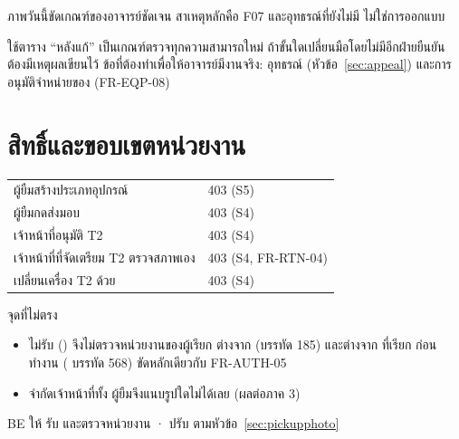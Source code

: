 \vpart[ต้องตัดสิน] ภาพวันนี้ขัดเกณฑ์ของอาจารย์ชัดเจน สาเหตุหลักคือ F07 และอุทธรณ์ที่ยังไม่มี ไม่ใช่การออกแบบ

ใช้ตาราง ``หลังแก้'' เป็นเกณฑ์ตรวจทุกความสามารถใหม่ ถ้าขั้นใดเปลี่ยนมือโดยไม่มีอีกฝ่ายยืนยัน ต้องมีเหตุผลเขียนไว้
ข้อที่ต้องทำเพื่อให้อาจารย์มีงานจริง: อุทธรณ์ (หัวข้อ~\ref{sec:appeal}) และการอนุมัติจำหน่ายของ (FR-EQP-08)

\section{สิทธิ์และขอบเขตหน่วยงาน}
\label{sec:scope}

\begin{goodbox}[title={ตรวจแล้ว --- สิทธิ์ตามบทบาทที่ทดสอบ ถูกทุกข้อ}]
\begin{tabular}{L{6.4cm}L{7.4cm}}
ผู้ยืมสร้างประเภทอุปกรณ์ & 403  (S5) \\
ผู้ยืมกดส่งมอบ & 403  (S4) \\
เจ้าหน้าที่อนุมัติ T2 & 403  (S4) \\
เจ้าหน้าที่ที่จัดเตรียม T2 ตรวจสภาพเอง & 403  (S4, FR-RTN-04) \\
เปลี่ยนเครื่อง T2 ด้วย  & 403  (S4) \\
\end{tabular}
\end{goodbox}

จุดที่ไม่ตรง
\begin{itemize}
\item {} ไม่รับ  () จึงไม่ตรวจหน่วยงานของผู้เรียก
      ต่างจาก  (บรรทัด 185) และต่างจาก 
      ที่เรียก  ก่อนทำงาน
      ( บรรทัด 568) ขัดหลักเดียวกับ FR-AUTH-05
\item {} จำกัดเจ้าหน้าที่ทั้ง  ผู้ยืมจึงแนบรูปใดไม่ได้เลย (ผลต่อภาค 3)
\end{itemize}
\vbad{} \quad
{}
BE ให้  รับ  และตรวจหน่วยงาน · ปรับ  ตามหัวข้อ~\ref{sec:pickupphoto}

